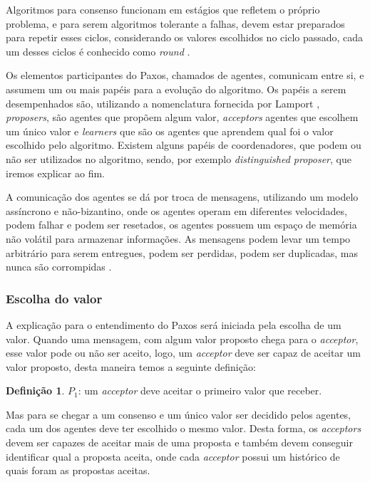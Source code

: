 \documentclass[12pt,
openright, 
oneside,
a4paper,
brazil]{facom-ufu-abntex2}
\theoremstyle{definition}
\newtheorem*{definition}{Definição}
\begin{document}
Algoritmos para consenso funcionam em estágios que refletem o próprio problema, e para
serem algoritmos tolerante a falhas, devem estar preparados para repetir esses ciclos,
considerando os valores escolhidos no ciclo passado, cada um desses ciclos é conhecido como
\textit{round} \citep{camargos2008multicoordinated}.

Os elementos participantes do Paxos, chamados de agentes, comunicam entre si, e assumem 
um ou mais papéis para a evolução do algoritmo. Os papéis a serem desempenhados são, 
utilizando a nomenclatura fornecida por Lamport \citep{lamport2001paxos}, 
\textit{proposers}, são agentes que propõem algum valor, \textit{acceptors} 
agentes que escolhem um único valor e \textit{learners} que são os agentes que aprendem
qual foi o valor escolhido pelo algoritmo.
Existem alguns papéis de coordenadores, que podem ou não ser utilizados no algoritmo, 
sendo, por exemplo \textit{distinguished proposer}, que iremos explicar ao fim.

A comunicação dos agentes se dá por troca de mensagens, utilizando um modelo assíncrono e
não-bizantino, onde os agentes operam em diferentes velocidades, podem falhar e podem ser
resetados, os agentes possuem um espaço de memória não volátil para armazenar informações.
As mensagens podem levar um tempo arbitrário para serem entregues, podem ser perdidas, podem
ser duplicadas, mas nunca são corrompidas \citep{lamport2001paxos}.

\subsubsection{Escolha do valor}
A explicação para o entendimento do Paxos será iniciada pela escolha de um valor. 
Quando uma mensagem, com algum
valor proposto chega para o \textit{acceptor}, esse valor pode ou não ser aceito, logo,
um \textit{acceptor} deve ser capaz de aceitar um valor proposto, desta maneira temos a seguinte 
definição:

\begin{definition}
$P_1$: um \textit{acceptor} deve aceitar o primeiro valor que receber.
\end{definition}

Mas para se chegar a um consenso e um único valor ser decidido pelos agentes, cada um
dos agentes deve ter escolhido o mesmo valor. Desta forma, os \textit{acceptors} devem
ser capazes de aceitar mais de uma proposta e também devem conseguir identificar qual
a proposta aceita, onde cada \textit{acceptor} possui um histórico de quais foram as
propostas aceitas.
\end{document}
